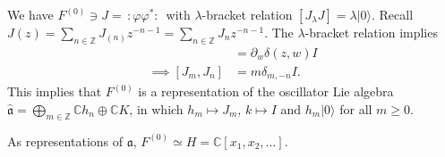 \medskip\noindent
We have $F^{(0)} \ni J = \,:\!\varphi \varphi^*\!:\,$ 
with $\lambda$-bracket relation $[J_\lambda J]=\lambda |0\rangle$.
Recall $J(z)=\sum_{n \in \mathbb{Z}}J_{(n)}z^{-n-1}=
\sum_{n \in \mathbb{Z}}J_n z^{-n-1}$.
The $\lambda$-bracket relation implies
\begin{align*}
[J(z),J(w)]&=\partial_w \delta(z,w)I\\
\implies [J_m,J_n]&=m \delta_{m,-n}I.
\end{align*}
This implies that $F^{(0)}$ is a representation
of the oscillator Lie algebra
$\hat{\mathfrak{a}}=\bigoplus_{m \in \mathbb{Z}}\mathbb{C} h_n \oplus
\mathbb{C}K$,
in which $h_m \mapsto  J_m$, $k \mapsto  I$ and $h_m |0\rangle$ 
for all $m \geq 0$.

\begin{proposition}
\label{proposition-F0-isomorphic-to-polynomial-representations}
As representations of $\mathfrak{a}$,
$F^{(0)}\simeq H=\mathbb{C}[x_1,x_2,\ldots]$.
\end{proposition}

